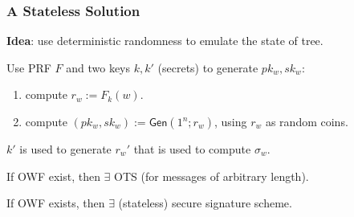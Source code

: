 \begin{comment}
\[ \Pr [\mathsf{Sigforge}_{\mathcal{A},\Pi }^{\text{1-time}}(n)=1] = \Pr [\mathsf{Sigforge}_{\mathcal{A}^*,\Pi^* }(n)=1]/\ell(n)\]
\end{proof}
\end{frame}
\end{comment}
\begin{frame}\frametitle{A Stateless Solution}
\textbf{Idea}: use deterministic randomness to emulate the state of tree.
\newline

Use PRF $F$ and two keys $k,k'$ (secrets) to generate $pk_w,sk_w$:
\begin{enumerate}
\item compute $r_w := F_k(w)$.
\item compute $(pk_w,sk_w) := \mathsf{Gen}(1^n;r_w)$, using $r_w$ as random coins.
\end{enumerate}
$k'$ is used to generate $r_w'$ that is used to compute $\sigma_w$.
\begin{lemma}
If OWF exist, then $\exists$ OTS (for messages of arbitrary length).
\end{lemma}
\begin{theorem}
If OWF exists, then $\exists$ (stateless) secure signature scheme.
\end{theorem}
\end{frame}
